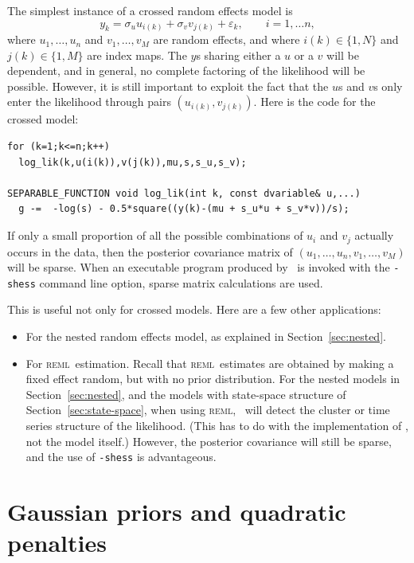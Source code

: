 \documentclass{admbmanual}
\newcommand{\scREML}{\textsc{reml}}
\begin{document}
The simplest instance of a crossed random effects model is
\[
y_k = \sigma_u u_{i(k)} + \sigma_v v_{j(k)}+\varepsilon_k,
\qquad i=1,\ldots n,
\]
where $u_1,\ldots,u_n$ and $v_1,\ldots,v_M$ are random effects, and
where $i(k)\in\{1,N\}$ and $j(k)\in\{1,M\}$ are index maps. The $y$s sharing
either a $u$ or a $v$ will be dependent, and in general, no complete factoring
of the likelihood will be possible. However, it is still important to exploit
the fact that the $u$s and $v$s only enter the likelihood through pairs
$(u_{i(k)},v_{j(k)})$. Here is the code for the crossed model:
\begin{lstlisting}
for (k=1;k<=n;k++)
  log_lik(k,u(i(k)),v(j(k)),mu,s,s_u,s_v);

SEPARABLE_FUNCTION void log_lik(int k, const dvariable& u,...)
  g -=  -log(s) - 0.5*square((y(k)-(mu + s_u*u + s_v*v))/s);
\end{lstlisting}
If only a small proportion of all the possible combinations of $u_i$ and $v_j$
actually occurs in the data, then the posterior covariance matrix of
$(u_1,\ldots,u_n,v_1,\ldots,v_M)$ will be sparse. When an executable
program produced by \scAR\ is invoked with the \texttt{-shess} command line
option, sparse matrix calculations are used.

This is useful not only for crossed models. Here are a few other applications:
\begin{itemize}
  \item For the nested random effects model, as explained in
  Section~\ref{sec:nested}.

  \item For \scREML\ estimation. Recall that \scREML\ estimates are obtained by
  making a fixed effect random, but with no prior distribution. For the nested
  models in Section~\ref{sec:nested}, and the models with state-space structure
  of Section~\ref{sec:state-space}, when using \scREML, \scAR\ will detect the
  cluster or time series structure of the likelihood. (This has to do with the
  implementation of \scAR, not the model itself.) However, the posterior
  covariance will still be sparse, and the use of \texttt{-shess} is
  advantageous. 
\end{itemize}

\section{Gaussian priors and quadratic penalties\label{gaussianprior}}
\end{document}
